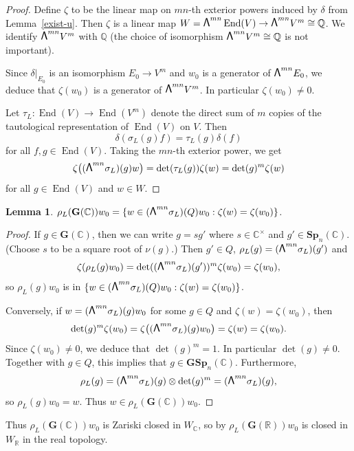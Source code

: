 \documentclass[JEP,XML,SOM,Unicode,NoFloatCountersInSection]{cedram}
\newcommand\bw{{\hbox{\large$\mathsf{\Lambda}$}}}
\newcommand{\bC}{\mathbb{C}}
\newcommand{\bQ}{\mathbb{Q}}
\newcommand{\bR}{\mathbb{R}}
\newcommand{\gG}{\mathbf{G}}
\newcommand{\gGSp}{\mathbf{GSp}}
\newcommand{\gSp}{\mathbf{Sp}}
\DeclareMathOperator{\End}{End}
\let\extpower\bw
\newtheorem{lemma}{Lemma}[section]
\begin{document}
\begin{proof}
Define $\zeta$ to be the linear map on $mn$-th exterior powers induced by $\delta$ from Lemma~\ref{exist-u}.
Then $\zeta$ is a linear map $W = \extpower^{mn} \End(V) \to \extpower^{mn} V^m \cong \bQ$.
We identify $\extpower^{mn} V^m$ with $\bQ$ (the choice of isomorphism $\extpower^{mn} V^m \cong \bQ$ is not important).

Since $\delta|_{E_0}$ is an isomorphism $E_0 \to V^m$ and $w_0$ is a generator of $\extpower^{mn} E_0$, we deduce that $\zeta(w_0)$ is a generator of $\extpower^{mn} V^m$.
In particular $\zeta(w_0) \neq 0$.

Let $\tau_L \colon \End(V) \to \End(V^m)$ denote the direct sum of $m$ copies of the tautological representation of $\End(V)$ on $V$.
Then
\[
\delta(\sigma_L(g)f) = \tau_L(g)\delta(f)
\]
for all $f, g \in \End(V)$.
Taking the $mn$-th exterior power, we get
\[
\zeta \bigl( (\extpower^{mn} \sigma_L)(g)w \bigr) = \det(\tau_L(g)) \zeta(w) = \det(g)^m \zeta(w)
\]
for all $g \in \End(V)$ and $w \in W$.
\end{proof}

\begin{lemma}
$\rho_L(\gG(\bC))w_0 = \{ w \in (\extpower^{mn} \sigma_L)(Q)w_0 : \zeta(w) = \zeta(w_0) \}$.
\end{lemma}

\begin{proof}
If $g \in \gG(\bC)$, then we can write $g = s g'$ where $s \in \bC^\times$ and $g' \in \gSp_n(\bC)$. (Choose $s$ to be a square root of $\nu(g)$.)
Then $g' \in Q$, $\rho_L(g) = (\extpower^{mn} \sigma_L)(g')$ and
\[
\zeta(\rho_L(g)w_0) = \det((\extpower^{mn} \sigma_L)(g'))^m \zeta(w_0) = \zeta(w_0),
\]
so $\rho_L(g)w_0$ is in $\{ w \in (\extpower^{mn} \sigma_L)(Q)w_0 : \zeta(w) = \zeta(w_0) \}$.

Conversely, if $w = (\extpower^{mn} \sigma_L)(g)w_0$ for some $g \in Q$ and $\zeta(w) = \zeta(w_0)$, then
\[
\det(g)^m \zeta(w_0) = \zeta \bigl( (\extpower^{mn} \sigma_L)(g)w_0 \bigr) = \zeta(w) = \zeta(w_0).
\]
Since $\zeta(w_0) \neq 0$, we deduce that $\det(g)^m = 1$.
In particular $\det(g) \neq 0$.
Together with $g \in Q$, this implies that $g \in \gGSp_n(\bC)$.
Furthermore,
\[
\rho_L(g) = (\extpower^{mn} \sigma_L)(g) \otimes \det(g)^m = (\extpower^{mn} \sigma_L)(g),
\]
so $\rho_L(g)w_0 = w$.
Thus $w \in \rho_L(\gG(\bC))w_0$.
\end{proof}

Thus $\rho_L(\gG(\bC))w_0$ is Zariski closed in $W_\bC$, so by \cite[Prop.\,6.3]{BHC62} $\rho_L(\gG(\bR))w_0$ is closed in $W_\bR$ in the real topology.
\end{document}
